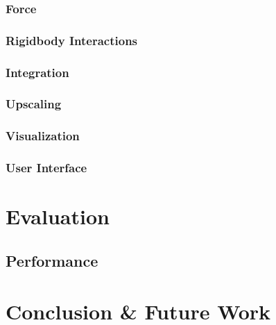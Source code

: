 \documentclass[intern]{cgMA}
\begin{document}
    \subsubsection{Force}
    
    \subsubsection{Rigidbody Interactions}
    
    \subsubsection{Integration}
    
    \subsubsection{Upscaling}
    
    \subsubsection{Visualization}
    
    \subsubsection{User Interface}
    
    \section{Evaluation}
    
    \subsection{Performance}
    
    \section{Conclusion \& Future Work}
    
    \newpage
    \printbibliography
\end{document}
